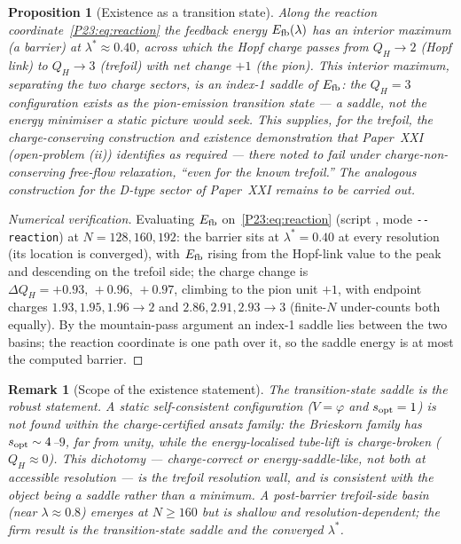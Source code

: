 \documentclass[11pt,a4paper]{article}
\newtheorem{proposition}[theorem]{Proposition}
\newtheorem{remark}[theorem]{Remark}
\theoremstyle{definition}\newtheorem{definition}[theorem]{Definition}
\newcommand{\vp}{\varphi}
\newcommand{\QH}{Q_H}
\begin{document}
\begin{proposition}[Existence as a transition state]
\label{P23:prop:existence}
Along the reaction coordinate~\eqref{P23:eq:reaction} the feedback energy $E_{\rm fb}(\lambda)$ has
an interior maximum (a barrier) at $\lambda^\ast\approx0.40$, across which the Hopf charge passes
from $\QH\!\to\!2$ (Hopf link) to $\QH\!\to\!3$ (trefoil) with net change $+1$ (the pion). This
interior maximum, separating the two charge sectors, is an index-1 saddle of $E_{\rm fb}$: the
$\QH=3$ configuration exists as the pion-emission transition state --- a \emph{saddle}, not the
energy minimiser a static picture would seek. This supplies, for the trefoil, the
charge-conserving construction and existence demonstration that Paper~XXI~\cite{Paper21}
(open-problem (ii)) identifies as required --- there noted to fail under charge-non-conserving
free-flow relaxation, ``even for the known trefoil.'' The analogous construction for the D-type
sector of Paper~XXI remains to be carried out.
\end{proposition}

\begin{proof}[Numerical verification]
Evaluating $E_{\rm fb}$ on~\eqref{P23:eq:reaction} (script , mode
\texttt{-{}-reaction}) at $N=128,160,192$: the barrier sits at $\lambda^\ast=0.40$ at every
resolution (its location is converged), with $E_{\rm fb}$ rising from the Hopf-link value to the
peak and descending on the trefoil side; the charge change is $\Delta\QH=+0.93,\,+0.96,\,+0.97$,
climbing to the pion unit $+1$, with endpoint charges $1.93,1.95,1.96\!\to\!2$ and
$2.86,2.91,2.93\!\to\!3$ (finite-$N$ under-counts both equally). By the mountain-pass argument an
index-1 saddle lies between the two basins; the reaction coordinate is one path over it, so the
saddle energy is at most the computed barrier.
\end{proof}

\begin{remark}[Scope of the existence statement]
\label{P23:rem:existence_scope}
The transition-state saddle is the robust statement. A \emph{static} self-consistent configuration
($V=\vp$ and $s_{\rm opt}=1$) is \emph{not} found within the charge-certified ansatz family: the
Brieskorn family has $s_{\rm opt}\sim4$--$9$, far from unity, while the energy-localised tube-lift
is charge-broken ($\QH\approx0$). This dichotomy --- charge-correct or energy-saddle-like, not both
at accessible resolution --- is the trefoil resolution wall, and is consistent with the object
being a saddle rather than a minimum. A post-barrier trefoil-side basin (near $\lambda\approx0.8$)
emerges at $N\ge160$ but is shallow and resolution-dependent; the firm result is the
transition-state saddle and the converged $\lambda^\ast$.
\end{remark}
\end{document}
